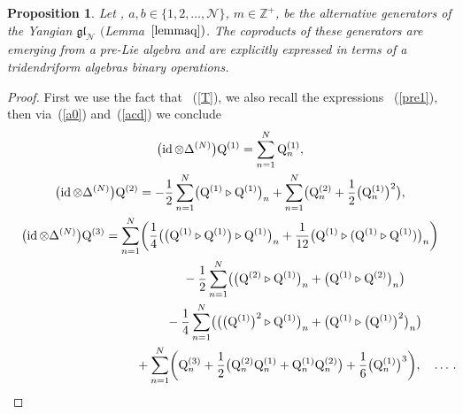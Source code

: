 \documentclass[pdftex]{sigma}
\numberwithin{equation}{section}
\newtheorem{pro}[thm]{Proposition}
\theoremstyle{definition}
\newcommand{\id}{\operatorname{id}}
\begin{document}
\begin{pro} Let , $a,b \in \{1, 2,\dots, {\mathcal N } \}$, $m \in {\mathbb Z}^+$, be the alternative generators of the Yangian $\mathfrak{gl}_{\mathcal N}$ $($Lemma~$\ref{lemmaq})$. The coproducts of these generators are emerging from a pre-Lie algebra and are explicitly expressed in terms of a tridendriform algebras binary operations.
\end{pro}
\begin{proof}
First we use the fact that \smash{$\bigl(\id\otimes \Delta^{(N)}\bigr){\mathrm Q}^{(m)} = {\mathcal Q}^{(m)}(N+1)$}~(\ref{T}), we also recall the expressions ~(\ref{pre1}), then via~(\ref{a0}) and~(\ref{acd}) we conclude
\begin{gather}
 \bigl(\id\otimes \Delta^{(N)}\bigr){\mathrm Q}^{(1)}= \sum_{n=1}^N{\mathrm Q}^{(1)}_n, \cr
 \bigl(\id\otimes \Delta^{(N)}\bigr){\mathrm Q}^{(2)}=-\frac{1}{2} \sum_{n=1}^N
 \bigl({\mathrm Q}^{(1)} \triangleright {\mathrm Q}^{(1)}\bigr)_n +\sum_{n=1}^N\bigl({\mathrm Q}_n^{(2)} +\frac{1}{2} \bigl({\mathrm Q}^{(1)}_n\bigr)^2\bigr),\nonumber\\
 \bigl(\id\otimes \Delta^{(N)}\bigr){\mathrm Q}^{(3)}= \sum_{n=1}^N\biggl(
\frac{1}{4} \bigl(\bigl({\mathrm Q}^{(1)} \triangleright {\mathrm Q}^{(1)}\bigr) \triangleright {\mathrm Q}^{(1)}\bigr)_n +\frac{1}{12} \bigl({\mathrm Q}^{(1)} \triangleright ({\mathrm Q}^{(1)} \triangleright {\mathrm Q}^{(1)})\bigr)_n \biggr)\cr
\hphantom{\bigl(\id\otimes \Delta^{(N)}\bigr){\mathrm Q}^{(3)}= \sum_{n=1}^N\biggl(}{} -
\frac{1}{2} \sum_{n=1}^N\bigl(\bigl({\mathrm Q}^{(2)} \triangleright {\mathrm Q}^{(1)}\bigr)_n+ \bigl({\mathrm Q}^{(1)}\triangleright {\mathrm Q}^{(2)}\bigr)_n\bigr) \cr
\hphantom{\bigl(\id\otimes \Delta^{(N)}\bigr){\mathrm Q}^{(3)}= \sum_{n=1}^N\biggl(}{} -
\frac{1}{4} \sum_{n=1}^N\bigl(\bigl(\bigl({\mathrm Q}^{(1)}\bigr)^2 \triangleright {\mathrm Q}^{(1)}\bigr)_n+ \bigl({\mathrm Q}^{(1)}\triangleright \bigl({\mathrm Q}^{(1)}\bigr)^2 \bigr)_n\bigr) \nonumber\\
\hphantom{\bigl(\id\otimes \Delta^{(N)}\bigr){\mathrm Q}^{(3)}= \sum_{n=1}^N\biggl(}{}
+ \sum_{n=1}^N \biggl({\mathrm Q}_n^{(3)} + \frac{1}{2} \bigl( {\mathrm Q}_n^{(2)} {\mathrm Q}_n^{(1)} +{\mathrm Q}_n^{(1)} {\mathrm Q}_n^{(2)} \bigr) + \frac{1}{6} \bigl({\mathrm Q}^{(1)}_n\bigr)^3\biggr), \quad \dots\,. \!\!\label{pre1b}
\end{gather}


\end{proof}
\end{document}
